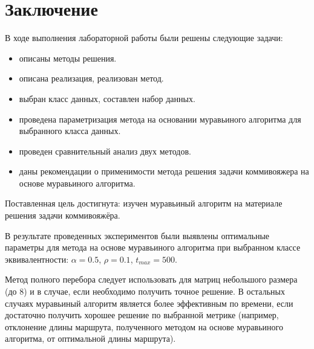 \chapter*{\hfill{\centering Заключение}\hfill}

В ходе выполнения лабораторной работы были решены следующие задачи:

\begin{itemize}[label=---] 
	\item описаны методы решения.
	\item описана реализация, реализован метод.
	\item выбран класс данных, составлен набор данных.
	\item проведена параметризация метода на основании муравьиного алгоритма для выбранного класса данных.
	\item проведен сравнительный анализ двух методов.
	\item даны рекомендации о применимости метода решения задачи коммивояжера на основе муравьиного алгоритма.
\end{itemize}

Поставленная цель достигнута: изучен муравьиный алгоритм на материале решения задачи коммивояжёра.

В результате проведенных экспериментов были выявлены оптимальные параметры для метода на основе муравьиного алгоритма при выбранном классе эквивалентности: $\alpha = 0.5$, $\rho = 0.1$, $ t_{max} = 500$. 

Метод полного перебора следует использовать для матриц небольшого размера (до 8) и в случае, если необходимо получить точное решение. 
В остальных случаях муравьиный алгоритм является более эффективным по времени, если достаточно получить хорошее решение по выбранной метрике (например, отклонение длины маршрута, полученного методом на основе муравьиного алгоритма, от оптимальной длины маршрута).